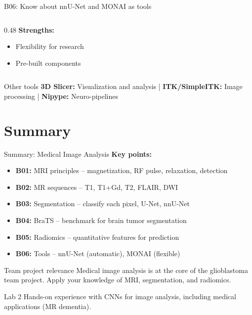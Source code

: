 \documentclass[aspectratio=169, 10pt]{beamer}
\begin{document}
\begin{frame}{B06: Know about nnU-Net and MONAI as tools}
\begin{columns}[T]
\begin{column}{0.48\textwidth}
            \vspace{0.3cm}
            \textbf{Strengths:}
            \begin{itemize}
                \item Flexibility for research
                \item Pre-built components
            \end{itemize}
        \end{column}
    \end{columns}
    
    \vspace{0.2cm}
    \begin{block}{\footnotesize Other tools}
        \footnotesize \textbf{3D Slicer:} Visualization and analysis | \textbf{ITK/SimpleITK:} Image processing | \textbf{Nipype:} Neuro-pipelines
    \end{block}
\end{frame}

\section*{Summary}

\begin{frame}{Summary: Medical Image Analysis}
    \textbf{Key points:}
    \begin{itemize}
        \item \textbf{B01:} MRI principles -- magnetization, RF pulse, relaxation, detection
        \item \textbf{B02:} MR sequences -- T1, T1+Gd, T2, FLAIR, DWI
        \item \textbf{B03:} Segmentation -- classify each pixel, U-Net, nnU-Net
        \item \textbf{B04:} BraTS -- benchmark for brain tumor segmentation
        \item \textbf{B05:} Radiomics -- quantitative features for prediction
        \item \textbf{B06:} Tools -- nnU-Net (automatic), MONAI (flexible)
    \end{itemize}

    \vspace{0.2cm}
    \begin{block}{\footnotesize Team project relevance}
        \footnotesize Medical image analysis is at the core of the glioblastoma team project. Apply your knowledge of MRI, segmentation, and radiomics.
    \end{block}

    \begin{block}{\footnotesize Lab 2}
        \footnotesize Hands-on experience with CNNs for image analysis, including medical applications (MR dementia).
    \end{block}
\end{frame}
\end{document}
